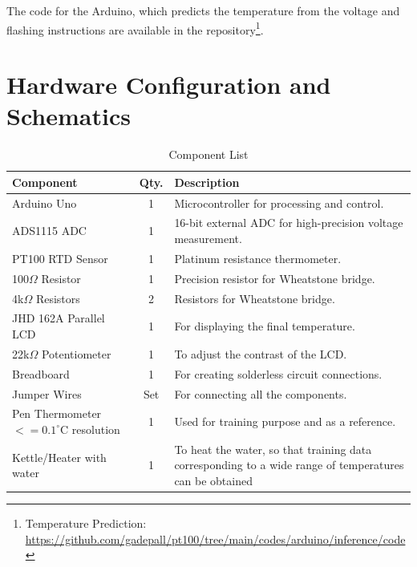 \documentclass[conference]{IEEEtran}
\begin{document}
The code for the Arduino, which predicts the temperature from the voltage and flashing instructions are available in the repository\footnote{Temperature Prediction: \url{https://github.com/gadepall/pt100/tree/main/codes/arduino/inference/code}}.

\appendices

\section{Hardware Configuration and Schematics}
\label{app:Hardware}

\begin{table}[H]
\centering
\caption{Component List}
\label{table:list_table}
\begin{tabular}{|l|c|p{4cm}|}
    \hline
    \textbf{Component} & \textbf{Qty.} & \textbf{Description} \\
    \hline
    Arduino Uno & 1 & Microcontroller for processing and control. \\
    \hline
    ADS1115 ADC & 1 & 16-bit external ADC for high-precision voltage measurement. \\
    \hline
    PT100 RTD Sensor & 1 & Platinum resistance thermometer. \\
    \hline
    100$\Omega$ Resistor & 1 & Precision resistor for Wheatstone bridge. \\
    \hline
    4k$\Omega$ Resistors & 2 & Resistors for Wheatstone bridge. \\
    \hline
    JHD 162A Parallel LCD & 1 & For displaying the final temperature. \\
    \hline
    22k$\Omega$ Potentiometer & 1 & To adjust the contrast of the LCD. \\
    \hline
    Breadboard & 1 & For creating solderless circuit connections. \\
    \hline
    Jumper Wires & Set & For connecting all the components. \\
    \hline
    \makecell{Pen Thermometer \\ $<=0.1^\circ$C resolution} & 1 & Used for training purpose and as a reference. \\
    \hline
    Kettle/Heater with water & 1 & To heat the water, so that training data corresponding to a wide range of temperatures can be obtained\\
    \hline
\end{tabular}
\end{table}
\end{document}
